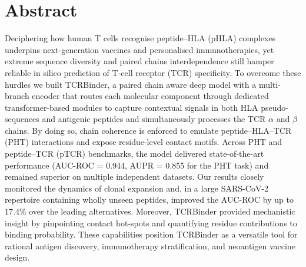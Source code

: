 \documentclass[10pt,letterpaper]{article}
\begin{document}
\section*{Abstract}
 Deciphering how human T cells recognise peptide–HLA (pHLA) complexes underpins next-generation vaccines and personalised immunotherapies, yet extreme sequence diversity and paired chains interdependence still hamper reliable in silico prediction of T-cell receptor (TCR) specificity. To overcome these hurdles we built TCRBinder, a paired chain aware deep model with a multi-branch encoder that routes each molecular component through dedicated transformer-based modules to capture contextual signals in both HLA pseudo-sequences and antigenic peptides and simultaneously processes the TCR $\alpha$ and $\beta$ chains. By doing so, chain coherence is enforced to emulate peptide–HLA–TCR (PHT) interactions and expose residue-level contact motifs. Across PHT and peptide–TCR (pTCR) benchmarks, the model delivered state-of-the-art performance (AUC-ROC = 0.944, AUPR = 0.855 for the PHT task) and remained superior on multiple independent datasets. Our results closely monitored the dynamics of clonal expansion and, in a large SARS-CoV-2 repertoire containing wholly unseen peptides, improved the AUC-ROC by up to 17.4\% over the leading alternatives. Moreover, TCRBinder provided mechanistic insight by pinpointing contact hot-spots and quantifying residue contributions to binding probability. These capabilities position TCRBinder as a versatile tool for rational antigen discovery, immunotherapy stratification, and neoantigen vaccine design.\\


\end{document}
